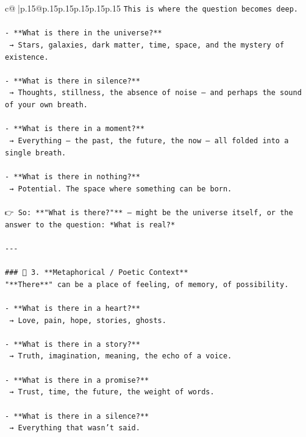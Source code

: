 \documentclass{article}
\begin{document}
{\begin{supertabular}{c@{$\;$}|p{.15\linewidth}@{}p{.15\linewidth}p{.15\linewidth}p{.15\linewidth}p{.15\linewidth}p{.15\linewidth}}
{{{\texttt{This is where the question becomes deep.} \\
\\ 
\texttt{{-} **What is there in the universe?**  } \\
\texttt{  → Stars, galaxies, dark matter, time, space, and the mystery of existence.} \\
\\ 
\texttt{{-} **What is there in silence?**  } \\
\texttt{  → Thoughts, stillness, the absence of noise — and perhaps the sound of your own breath.} \\
\\ 
\texttt{{-} **What is there in a moment?**  } \\
\texttt{  → Everything — the past, the future, the now — all folded into a single breath.} \\
\\ 
\texttt{{-} **What is there in nothing?**  } \\
\texttt{  → Potential. The space where something can be born.} \\
\\ 
\texttt{👉 So: **"What is there?"** — might be the universe itself, or the answer to the question: *What is real?*} \\
\\ 
\texttt{{-}{-}{-}} \\
\\ 
\texttt{\#\#\# 🔹 3. **Metaphorical / Poetic Context**  } \\
\texttt{"**There**" can be a place of feeling, of memory, of possibility.} \\
\\ 
\texttt{{-} **What is there in a heart?**  } \\
\texttt{  → Love, pain, hope, stories, ghosts.} \\
\\ 
\texttt{{-} **What is there in a story?**  } \\
\texttt{  → Truth, imagination, meaning, the echo of a voice.} \\
\\ 
\texttt{{-} **What is there in a promise?**  } \\
\texttt{  → Trust, time, the future, the weight of words.} \\
\\ 
\texttt{{-} **What is there in a silence?**  } \\
\texttt{  → Everything that wasn’t said.} \\
}}}
\end{supertabular}}
\end{document}
